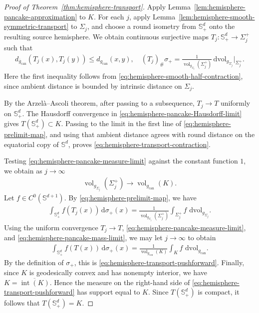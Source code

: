 \documentclass[11pt,reqno]{amsart}
\numberwithin{equation}{section}
\theoremstyle{definition}
\theoremstyle{remark}
\def\bS {\mathbb{S}}
\newcommand{\ud}{\mathrm{d}}
\newcommand{\0}{\emptyset}
\newcommand{\can}{\mathrm{can}}
\newcommand{\vol}{\operatorname{vol}}
\newcommand{\dvol}{\,\mathrm{dvol}}
\begin{document}
\begin{proof}[Proof of Theorem~\ref{thm:hemisphere-transport}]
Apply Lemma~\ref{lem:hemisphere-pancake-approximation} to $K$. For each $j$,
apply Lemma~\ref{lem:hemisphere-smooth-symmetric-transport} to $\Sigma_j$, and
choose a round isometry from $\bS^d_+$ onto the resulting source hemisphere.
We obtain continuous surjective maps $T_j:\bS^d_+\to\Sigma_j^+$ such that
\begin{align}\label{eq:hemisphere-prelimit-map}
        d_{\overline g_{\can}}(T_j(x),T_j(y))
        \leq
        d_{g_{\can}}(x,y),  \quad 
        (T_j)_\#\sigma_+
        =
        \frac{1}{\vol_{g_{\Sigma_j}}(\Sigma_j^+)}
        \dvol_{g_{\Sigma_j}}|_{\Sigma_j^+}.
\end{align}
Here the first inequality follows from
\eqref{eq:hemisphere-smooth-half-contraction}, since ambient distance is
bounded by intrinsic distance on $\Sigma_j$.

By the Arzel\`a--Ascoli theorem, after passing to a subsequence,
$T_j\to T$ uniformly on $\bS^d_+$. The Hausdorff convergence in
\eqref{eq:hemisphere-pancake-Hausdorff-limit} gives $ T(\bS^d_+) \subset K$. Passing to the limit in the first line of \eqref{eq:hemisphere-prelimit-map}, and using that ambient distance agrees with round distance on the equatorial copy of $\bS^d$, proves
\eqref{eq:hemisphere-transport-contraction}. 

Testing \eqref{eq:hemisphere-pancake-measure-limit} against the constant
function $1$, we obtain as $j\to \infty$
\begin{align}\label{eq:hemisphere-pancake-mass-limit}
        \vol_{g_{\Sigma_j}}(\Sigma_j^+)
        \rightarrow
        \vol_{g_{\can}}(K).
\end{align}
Let $f\in C^0(\bS^{d+1})$. By
\eqref{eq:hemisphere-prelimit-map}, we have
\begin{align}
        \int_{\bS^d_+}
        f(T_j(x))\,\ud\sigma_+(x)
        =
        \frac{1}{\vol_{g_{\Sigma_j}}(\Sigma_j^+)}
        \int_{\Sigma_j^+}
        f\,\dvol_{g_{\Sigma_j}}.
\end{align}
Using the uniform convergence $T_j\to T$,
\eqref{eq:hemisphere-pancake-measure-limit}, and
\eqref{eq:hemisphere-pancake-mass-limit}, we may let $j\to\infty$ to obtain
\begin{align}
        \int_{\bS^d_+}
        f(T(x))\,\ud\sigma_+(x)
        =
        \frac{1}{\vol_{g_{\can}}(K)}
        \int_K f\,\dvol_{g_{\can}}.
\end{align}
By the definition of $\sigma_+$, this is \eqref{eq:hemisphere-transport-pushforward}. Finally, since $K$ is geodesically convex and has nonempty interior, we have $K=\overline{\operatorname{int}(K)}.$ Hence the measure on the right-hand side of \eqref{eq:hemisphere-transport-pushforward} has support equal to $K$. Since $T(\bS^d_+)$ is compact, it follows that $T(\bS^d_+)=K.$
\end{proof}
\end{document}
